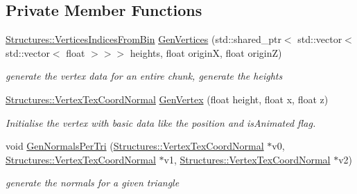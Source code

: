 \subsection*{Private Member Functions}
\begin{DoxyCompactItemize}
\item 
\mbox{\hyperlink{struct_structures_1_1_vertices_indices_from_bin}{Structures\+::\+Vertices\+Indices\+From\+Bin}} \mbox{\hyperlink{class_terrain_generation_helper_a2c7c7834ad5c8d4d4523931fbbc2f981}{Gen\+Vertices}} (std\+::shared\+\_\+ptr$<$ std\+::vector$<$ std\+::vector$<$ float $>$$>$$>$ heights, float originX, float originZ)
\begin{DoxyCompactList}\small\item\em generate the vertex data for an entire chunk, generate the heights \end{DoxyCompactList}\item 
\mbox{\hyperlink{struct_structures_1_1_vertex_tex_coord_normal}{Structures\+::\+Vertex\+Tex\+Coord\+Normal}} \mbox{\hyperlink{class_terrain_generation_helper_a3ef70fded2f8984224915ec14c1238a7}{Gen\+Vertex}} (float height, float x, float z)
\begin{DoxyCompactList}\small\item\em Initialise the vertex with basic data like the position and is\+Animated flag. \end{DoxyCompactList}\item 
void \mbox{\hyperlink{class_terrain_generation_helper_a1989d3e408497b90675799ded98feaf1}{Gen\+Normals\+Per\+Tri}} (\mbox{\hyperlink{struct_structures_1_1_vertex_tex_coord_normal}{Structures\+::\+Vertex\+Tex\+Coord\+Normal}} $\ast$v0, \mbox{\hyperlink{struct_structures_1_1_vertex_tex_coord_normal}{Structures\+::\+Vertex\+Tex\+Coord\+Normal}} $\ast$v1, \mbox{\hyperlink{struct_structures_1_1_vertex_tex_coord_normal}{Structures\+::\+Vertex\+Tex\+Coord\+Normal}} $\ast$v2)
\begin{DoxyCompactList}\small\item\em generate the normals for a given triangle \end{DoxyCompactList}\end{DoxyCompactItemize}

